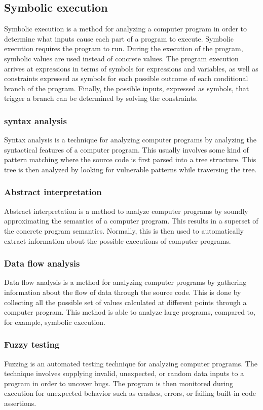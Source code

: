 \subsection{Symbolic execution}
\label{sec:symbolic-execution}
Symbolic execution is a method for analyzing a computer program in order to determine what inputs cause each part of a program to execute. Symbolic execution requires the program to run. During the execution of the program, symbolic values are used instead of concrete values. The program execution arrives at expressions in terms of symbols for expressions and variables, as well as constraints expressed as symbols for each possible outcome of each conditional branch of the program. Finally, the possible inputs, expressed as symbols, that trigger a branch can be determined by solving the constraints.

\subsubsection{syntax analysis}
\label{sec:syntax-analysis}
Syntax analysis is a technique for analyzing computer programs by analyzing the syntactical features of a computer program. This usually involves some kind of pattern matching where the source code is first parsed into a tree structure. This tree is then analyzed by looking for vulnerable patterns while traversing the tree.

\subsubsection{Abstract interpretation}
\label{sec:abstract-interpretation}
Abstract interpretation is a method to analyze computer programs by soundly approximating the semantics of a computer program. This results in a superset of the concrete program semantics. Normally, this is then used to automatically extract information about the possible executions of computer programs.

\subsubsection{Data flow analysis}
\label{sec:data-flow-analysis}
Data flow analysis is a method for analyzing computer programs by gathering information about the flow of data through the source code. This is done by collecting all the possible set of values calculated at different points through a computer program. This method is able to analyze large programs, compared to, for example, symbolic execution.

\subsubsection{Fuzzy testing}
\label{sec:fuzzy-testing}
Fuzzing is an automated testing technique for analyzing computer programs. The technique involves supplying invalid, unexpected, or random data inputs to a program in order to uncover bugs. The program is then monitored during execution for unexpected behavior such as crashes, errors, or failing built-in code assertions.


